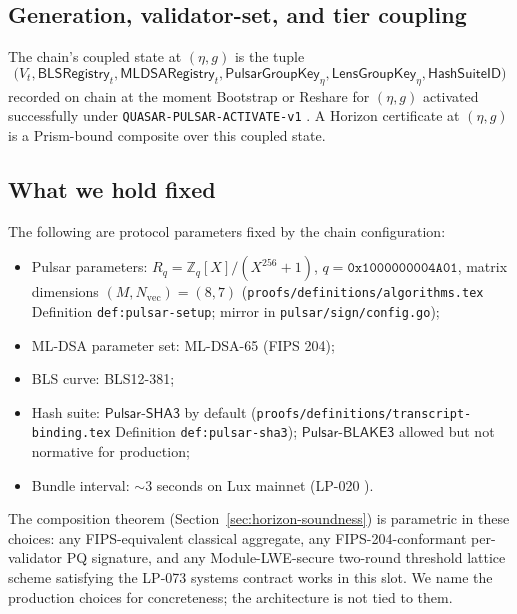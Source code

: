 \subsection{Generation, validator-set, and tier coupling}

\begin{definition}
\label{def:coupled-state}
The chain's coupled state at $(\eta, g)$ is the tuple
\[
  \bigl(V_t, \mathsf{BLSRegistry}_t, \mathsf{MLDSARegistry}_t, \mathsf{PulsarGroupKey}_\eta, \mathsf{LensGroupKey}_\eta, \mathsf{HashSuiteID}\bigr)
\]
recorded on chain at the moment Bootstrap or Reshare for $(\eta, g)$ activated successfully under \texttt{QUASAR-PULSAR-ACTIVATE-v1} \cite{luxpulsar}. A Horizon certificate at $(\eta, g)$ is a Prism-bound composite over this coupled state.
\end{definition}

\subsection{What we hold fixed}

The following are protocol parameters fixed by the chain configuration:
\begin{itemize}[leftmargin=2em,nosep]
  \item Pulsar parameters: $R_q = \mathbb{Z}_q[X]/(X^{256}+1)$, $q = \texttt{0x1000000004A01}$, matrix dimensions $(M, N_{\mathrm{vec}}) = (8, 7)$ (\texttt{proofs/definitions/algorithms.tex} Definition \texttt{def:pulsar-setup}; mirror in \texttt{pulsar/sign/config.go});
  \item ML-DSA parameter set: ML-DSA-65 (FIPS 204);
  \item BLS curve: BLS12-381;
  \item Hash suite: $\mathsf{Pulsar\text{-}SHA3}$ by default (\texttt{proofs/definitions/transcript-binding.tex} Definition \texttt{def:pulsar-sha3}); $\mathsf{Pulsar\text{-}BLAKE3}$ allowed but not normative for production;
  \item Bundle interval: $\sim 3$ seconds on Lux mainnet (LP-020 \cite{lp020}).
\end{itemize}

The composition theorem (Section~\ref{sec:horizon-soundness}) is parametric in these choices: any FIPS-equivalent classical aggregate, any FIPS-204-conformant per-validator PQ signature, and any Module-LWE-secure two-round threshold lattice scheme satisfying the LP-073 systems contract works in this slot. We name the production choices for concreteness; the architecture is not tied to them.
